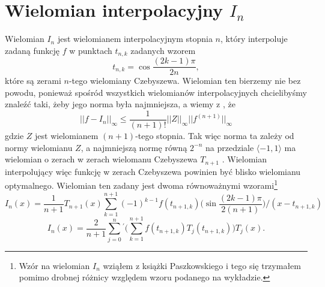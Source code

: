 \documentclass[11pt,wide]{mwart}
\begin{document}
\section{Wielomian interpolacyjny $I_n$}
Wielomian $I_n$ jest wielomianem interpolacyjnym stopnia $n$, który interpoluje zadaną funkcję $f$ w punktach $t_{n,k}$ zadanych wzorem
\begin{equation} \label{Zera}
t_{n,k} = \cos \frac{(2k-1)\pi}{2n},
\end{equation}
które są zerami $n$-tego wielomiany Czebyszewa. Wielomian ten bierzemy nie bez powodu, ponieważ spośród wszystkich wielomianów interpolacyjnych chcielibyśmy znaleźć taki, żeby jego norma była najmniejsza, a wiemy z \cite{i1}, że 
\begin{equation}
||f - I_n||_{\infty} \leq \frac{1}{(n+1)!} ||Z||_{\infty} ||f^{(n+1)}||_{\infty}
\end{equation}
gdzie $Z$ jest wielomianem $(n+1)$-tego stopnia. Tak więc norma ta zależy od normy wielomianu $Z$, a najmniejszą normę równą $2^{-n}$ na przedziale $\langle -1, 1 \rangle$ ma wielomian o zerach w zerach wielomanu Czebyszewa  $T_{n+1}$ \cite{i2}. Wielomian interpolujący więc funkcję w zerach Czebyszewa powinien być blisko wielomianu optymalnego. Wielomian ten zadany jest dwoma równoważnymi wzorami\footnote{Wzór na wielomian $I_n$ wziąłem z książki Paszkowskiego i tego się trzymałem pomimo drobnej różnicy względem wzoru podanego na wykładzie.}
\begin{equation} \label{I1}
I_n(x) = \frac{1}{n+1}T_{n+1}(x) \sum_{k=1}^{n+1} (-1)^{k-1}f(t_{n+1,k}) \Big( \sin \frac{(2k-1) \pi}{2(n+1)} \Big) / (x-t_{n+1,k})
\end{equation}
\begin{equation} \label{I2}
I_n(x) = \frac{2}{n+1} \sum_{j=0}^{n} {}^{'} \Big( \sum_{k=1}^{n+1} f(t_{n+1, k}) T_j(t_{n+1, k}) \Big) T_j(x).
\end{equation}
\end{document}
